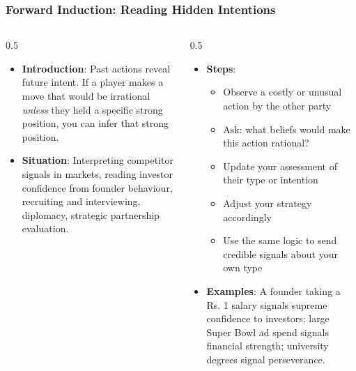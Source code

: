 \begin{frame}[fragile]\frametitle{Forward Induction: Reading Hidden Intentions}
\begin{columns}
    \begin{column}[T]{0.5\linewidth}
      \begin{itemize}
        \item \textbf{Introduction}: Past actions reveal future intent. If a player makes a move that would be irrational \textit{unless} they held a specific strong position, you can infer that strong position.
        \item \textbf{Situation}: Interpreting competitor signals in markets, reading investor confidence from founder behaviour, recruiting and interviewing, diplomacy, strategic partnership evaluation.
      \end{itemize}
    \end{column}
    \begin{column}[T]{0.5\linewidth}
      \begin{itemize}
        \item \textbf{Steps}:
        \begin{itemize}
          \item Observe a costly or unusual action by the other party
          \item Ask: what beliefs would make this action rational?
          \item Update your assessment of their type or intention
          \item Adjust your strategy accordingly
          \item Use the same logic to send credible signals about your own type
        \end{itemize}\item \textbf{Examples}: A founder taking a Rs. 1 salary signals supreme confidence to investors; large Super Bowl ad spend signals financial strength; university degrees signal perseverance.
      \end{itemize}
    \end{column}
  \end{columns}
\end{frame}


